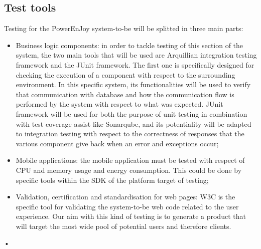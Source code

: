 \documentclass[10pt, a4paper,titlepage]{article}
\begin{document}
\subsection{Test tools}
Testing for the PowerEnJoy system-to-be will be splitted in three main parts:
\begin{itemize}
\item Business logic components: in order to tackle testing of this section of the system, the two main tools that will be used are Arquillian integration testing framework and the JUnit framework. The first one is specifically designed for checking the execution of a component with respect to the surrounding environment. In this specific system, its functionalities will be used to verify that communication with database and how the communication flow is performed by the system with respect to what was expected. JUnit framework will be used for both the purpose of unit testing in combination with test coverage assist like Sonarqube, and its potentiality will be adapted to integration testing with respect to the correctness of responses that the various component give back when an error and exceptions occur;
\item Mobile applications: the mobile application must be tested with respect of CPU and memory usage and energy consumption. This could be done by specific tools within the SDK of the platform target of testing;
\item Validation, certification and standardisation for web pages: W3C is the specific tool for validating the system-to-be web code related to the user experience. Our aim with this kind of testing is to generate a product that will target the most wide pool of potential users and therefore clients.
\end{itemize}•
\end{document}
